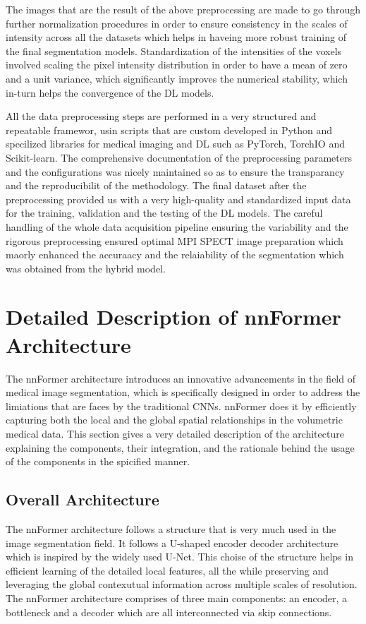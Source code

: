 The images that are the result of the above preprocessing are made to go through further normalization procedures in order to ensure consistency in the scales of intensity across all the datasets which helps in haveing more robust training of the final segmentation models. Standardization of the intensities of the voxels involved scaling the pixel intensity distribution in order to have a mean of zero and a unit variance, which significantly improves the numerical stability, which in-turn helps the convergence of the DL models.

All the data preprocessing steps are performed in a very structured and repeatable framewor, usin scripts that are custom developed in Python and specilized libraries for medical imaging and DL such as PyTorch, TorchIO and Scikit-learn. The comprehensive documentation of the preprocessing parameters and the configurations was nicely maintained so as to ensure the transparancy and the reproducibilit of the methodology. The final dataset after the preprocessing provided us with a very high-quality and standardized input data for the training, validation and the testing of the DL models. The careful handling of the whole data acquisition pipeline ensuring the variability and the rigorous preprocessing ensured optimal MPI SPECT image preparation which maorly enhanced the accuraacy and the relaiability of the segmentation which was obtained from the hybrid model.


\section{Detailed Description of nnFormer Architecture}

The nnFormer architecture introduces an innovative advancements in the field of medical image segmentation, which is specifically designed in order to address the limiations that are faces by the traditional CNNs. nnFormer does it by efficiently capturing both the local and the global spatial relationships in the volumetric medical data. This section gives a very detailed description of the architecture explaining the components, their integration, and the rationale behind the usage of the components in the spicified manner.

\subsection{Overall Architecture}

The nnFormer architecture follows a structure that is very much used in the image segmentation field. It follows a U-shaped encoder decoder architecture which is inspired by the widely used U-Net. This choise of the structure helps in efficient learning of the detailed local features, all the while preserving and leveraging the global contexutual information across multiple scales of resolution. The nnFormer architecture comprises of three main components: an encoder, a bottleneck and a decoder which are all interconnected via skip connections.

